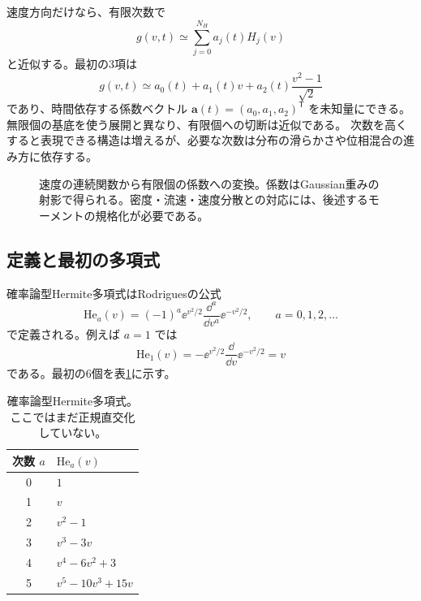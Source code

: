 速度方向だけなら、有限次数で
\[
g(v,t)\simeq\sum_{j=0}^{N_H}a_j(t)H_j(v)
\]
と近似する。最初の3項は
\[
g(v,t)\simeq a_0(t)+a_1(t)v+a_2(t)\frac{v^2-1}{\sqrt2}
\]
であり、時間依存する係数ベクトル $\bm a(t)=(a_0,a_1,a_2)^{\mathsf T}$ を未知量にできる。
無限個の基底を使う展開と異なり、有限個への切断は近似である。
次数を高くすると表現できる構造は増えるが、必要な次数は分布の滑らかさや位相混合の進み方に依存する。

\begin{figure}[htbp]
\centering

\caption{速度の連続関数から有限個の係数への変換。係数はGaussian重みの射影で得られる。密度・流速・速度分散との対応には、後述するモーメントの規格化が必要である。}
\label{fig:hermite-projection}
\end{figure}

\subsection{定義と最初の多項式}
確率論型Hermite多項式はRodriguesの公式
\[
\boxed{\mathrm{He}_a(v)=(-1)^a\ee^{v^2/2}
\frac{\dd^a}{\dd v^a}\ee^{-v^2/2}},\qquad a=0,1,2,\ldots
\]
で定義される。例えば $a=1$ では
\[
\mathrm{He}_1(v)=-\ee^{v^2/2}\frac{\dd}{\dd v}\ee^{-v^2/2}=v
\]
である。最初の6個を表\ref{tab:hermite-polynomials}に示す。

\begin{table}[htbp]
\centering
\caption{確率論型Hermite多項式。ここではまだ正規直交化していない。}
\label{tab:hermite-polynomials}
\begin{tabular}{cl}
\toprule 次数 $a$ & $\mathrm{He}_a(v)$ \\\midrule
0 & $1$\\
1 & $v$\\
2 & $v^2-1$\\
3 & $v^3-3v$\\
4 & $v^4-6v^2+3$\\
5 & $v^5-10v^3+15v$\\
\bottomrule
\end{tabular}
\end{table}

